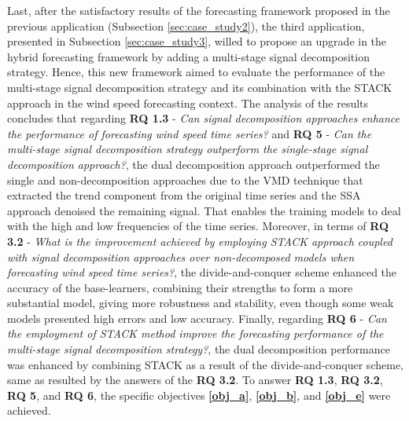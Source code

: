 Last, after the satisfactory results of the forecasting framework proposed in the previous application (Subsection \ref{sec:case_study2}), the third application, presented in Subsection \ref{sec:case_study3}, willed to propose an upgrade in the hybrid forecasting framework by adding a multi-stage signal decomposition strategy. Hence, this new framework aimed to evaluate the performance of the multi-stage signal decomposition strategy and its combination with the \ac{STACK} approach in the wind speed forecasting context. The analysis of the results concludes that regarding \textbf{RQ 1.3} - \textit{Can signal decomposition approaches enhance the performance of forecasting wind speed time series?} and \textbf{RQ 5} - \textit{Can the multi-stage signal decomposition strategy outperform the single-stage signal decomposition approach?}, the dual decomposition approach outperformed the single and non-decomposition approaches due to the \ac{VMD} technique that extracted the trend component from the original time series and the \ac{SSA} approach denoised the remaining signal. That enables the training models to deal with the high and low frequencies of the time series. Moreover, in terms of \textbf{RQ 3.2} - \textit{What is the improvement achieved by employing \ac{STACK} approach coupled with signal decomposition approaches over non-decomposed models when forecasting wind speed time series?}, the divide-and-conquer scheme enhanced the accuracy of the base-learners, combining their strengths to form a more substantial model, giving more robustness and stability, even though some weak models presented high errors and low accuracy. Finally, regarding \textbf{RQ 6} - \textit{Can the employment of \ac{STACK} method improve the forecasting performance of the multi-stage signal decomposition strategy?}, the dual decomposition performance was enhanced by combining \ac{STACK} as a result of the divide-and-conquer scheme, same as resulted by the answers of the \textbf{RQ 3.2}. To answer \textbf{RQ 1.3}, \textbf{RQ 3.2}, \textbf{RQ 5}, and \textbf{RQ 6}, the specific objectives \textbf{\ref{obj_a}}, \textbf{\ref{obj_b}}, and \textbf{\ref{obj_e}} were achieved.

